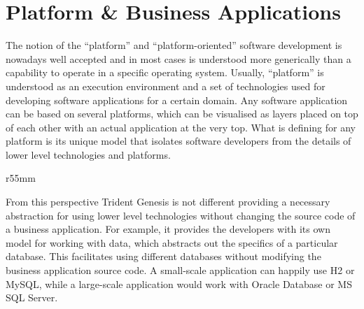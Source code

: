 \section{Platform \& Business Applications}\label{sec:02}  

  The notion of the ``platform'' and ``platform-oriented'' software development is nowadays well accepted and in most cases is understood more generically than a capability to operate in a specific operating system.
  Usually, ``platform'' is understood as an execution environment and a set of technologies used for developing software applications for a certain domain.
  Any software application can be based on several platforms, which can be visualised as layers placed on top of each other with an actual application at the very top.
  What is defining for any platform is its unique model that isolates software developers from the details of lower level technologies and platforms.

  \begin{wrapfigure}{r}{55mm}
    \centering    
  \end{wrapfigure}
  
  From this perspective Trident Genesis is not different providing a necessary abstraction for using lower level technologies without changing the source code of a business application.
  For example, it provides the developers with its own model for working with data, which abstracts out the specifics of a particular database.
  This facilitates using different databases without modifying the business application source code.
  A small-scale application can happily use H2 or MySQL, while a large-scale application would work with Oracle Database or MS SQL Server.

